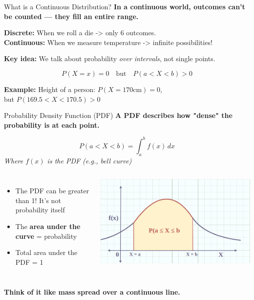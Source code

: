 \documentclass[handout,aspectratio=169]{beamer}
\begin{document}
\begin{frame}{What is a Continuous Distribution?}
	\textbf{In a continuous world, outcomes can't be counted — they fill an entire range.}
	
	\vspace{0.8em}
	\textbf{Discrete:} When we roll a die -> only 6 outcomes.\\
	\textbf{Continuous:} When we measure temperature -> infinite possibilities!
	
	\vspace{1em}
	\textbf{Key idea:} We talk about probability \textit{over intervals}, not single points.
	
	\vspace{1em}
	\[
		P(X = x) = 0 \quad \text{but} \quad P(a < X < b) > 0
	\]
	
	\vspace{0.8em}
	\textbf{Example:} Height of a person: $P(X = 170 \text{cm}) = 0$,\\
	but $P(169.5 < X < 170.5) > 0$
\end{frame}

\begin{frame}{Probability Density Function (PDF)}
	\textbf{A PDF describes how "dense" the probability is at each point.}
	
	\vspace{1em}
	\[
		P(a < X < b) = \int_a^b f(x) \, dx
	\]
	\textit{Where $f(x)$ is the PDF (e.g., bell curve)}
	
	\vspace{1em}
	\begin{columns}
		\begin{itemize}
			\item The PDF can be greater than 1! It’s not probability itself
			\item The \textbf{area under the curve} = probability
			\item Total area under the PDF = 1
		\end{itemize}
		  
		\includegraphics[width=\linewidth]{figs/pdf.png}
	\end{columns}
	  
	
	\vspace{0.5em}
	\textbf{Think of it like mass spread over a continuous line.}
\end{frame}
\end{document}
